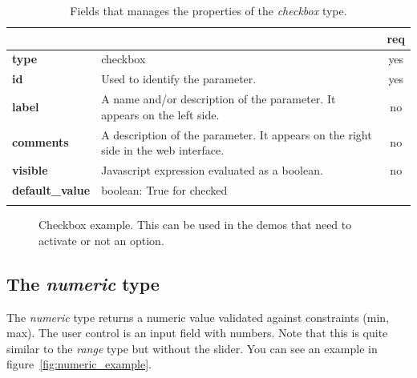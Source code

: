 \begin{longtable}{|>{\bf}L{\linewidth}|L{\linewidth}|c|}
\hline
      &  & {\bf req} 
\tabularnewline \hline \hline
 type  & checkbox  & yes \\ \hline
 id     & Used to identify the parameter. & yes \\ \hline
 label  & A name and/or description of the parameter. It appears on the left side. & no
                      \\ \hline
 comments & A description of the parameter. It appears on the right side in the web interface. & no
                      \\ \hline
 visible    & Javascript expression evaluated as a boolean. & no \\ \hline
 default\_value & boolean: True for checked & \\ \hline
\caption{Fields that manages the properties of the \emph{checkbox} type.}
\end{longtable}

\begin{figure}[h]
\centering
{}
\caption{Checkbox example. This can be used in the demos that need to activate or not an option.}
\label{fig:checkbox_example}
\end{figure}

\subsection{The \emph{numeric} type}

The \emph{numeric} type returns a numeric value validated against constraints (min, max). The user control is an input field with numbers. Note that this is quite similar to the \emph{range} type but without the slider. You can see an example in figure~\ref{fig:numeric_example}.

